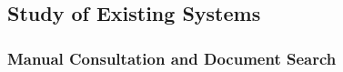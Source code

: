 

\subsection{Study of Existing Systems}


\subsubsection{Manual Consultation and Document Search}

